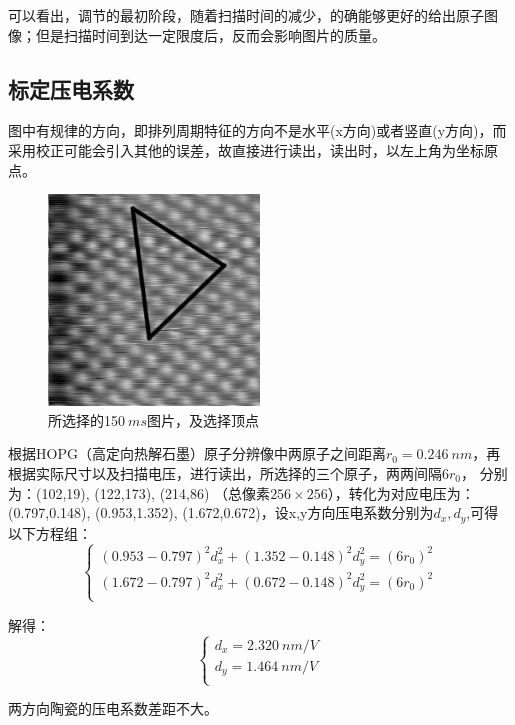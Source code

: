 \documentclass[aps,pre,12pt,preprint,onecolumn,showpacs,showkeys]{revtex4-1}
\begin{document}
可以看出，调节的最初阶段，随着扫描时间的减少，的确能够更好的给出原子图像；但是扫描时间到达一定限度后，反而会影响图片的质量。
\subsection{标定压电系数}
图中有规律的方向，即排列周期特征的方向不是水平(x方向)或者竖直(y方向)，而采用校正可能会引入其他的误差，故直接进行读出，读出时，以左上角为坐标原点。
\begin{figure}[htbp]
    \centering
    \includegraphics[width = 0.5\textwidth]{2*2_150_tri.jpeg}
    \caption{所选择的150$\ \si{ms}$图片，及选择顶点}
    \label{fig:3}
\end{figure}
根据HOPG（高定向热解石墨）原子分辨像中两原子之间距离$r_0=0.246\ nm$，再根据实际尺寸以及扫描电压，进行读出，所选择的三个原子，两两间隔$6r_0$，
分别为：(102,19), (122,173), (214,86) （总像素$256\times256$），转化为对应电压为：(0.797,0.148), (0.953,1.352), (1.672,0.672)，设x,y方向压电系数分别为$d_x,d_y$,可得以下方程组：
\begin{equation}
\begin{cases}
    (0.953-0.797)^2d_x^2+(1.352-0.148)^2d_y^2=(6r_0)^2\\
    (1.672-0.797)^2d_x^2+(0.672-0.148)^2d_y^2=(6r_0)^2\\
\end{cases}
\end{equation}

解得：
\begin{equation}
\begin{cases}
d_x = 2.320\ \si{nm\per V}\\
d_y = 1.464\ \si{nm\per V}\\
\end{cases}
\end{equation}

两方向陶瓷的压电系数差距不大。
\end{document}
